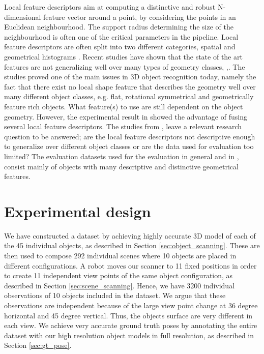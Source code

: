 \documentclass[10pt,twocolumn,letterpaper]{article}
\begin{document}
\indent Local feature descriptors aim at computing a distinctive and robust N-dimensional feature vector around a point, by considering the points in an Euclidean neighbourhood. The support radius determining the size of the neighbourhood is often one of the critical parameters in the pipeline. Local feature descriptors are often split into two different categories, spatial and geometrical histograms \cite{Salti2014}.
Recent studies have shown that the state of the art features are not generalizing well over many types of geometry classes, \cite{Guo2015},\cite{Buch2016}. The studies proved one of the main issues in 3D object recognition today, namely the fact that there exist no local shape feature that describes the geometry well over many different object classes, e.g. flat, rotational symmetrical and geometrically feature rich objects. What feature(s) to use are still dependent on the object geometry. However, the experimental result in \cite{Buch2016} showed the advantage of fusing several local feature descriptors. 
The studies from \cite{Guo2015},\cite{Buch2016} leave a relevant research question to be answered; are the local feature descriptors not descriptive enough to generalize over different object classes or are the data used for evaluation too limited? The evaluation datasets used for the evaluation in general and in \cite{Guo2015},\cite{Buch2016} consist mainly of objects with many descriptive and distinctive geometrical features.\\ 
\section{Experimental design} \label{sec:exp_design}
We have constructed a dataset by achieving highly accurate 3D model of each of the 45 individual objects, as described in Section \ref{sec:object_scanning}. These are then used to compose 292 individual scenes where 10 objects are placed in different configurations. A robot moves our scanner to 11 fixed positions in order to create 11 independent view points of the same object configuration, as described in Section \ref{sec:scene_scanning}. Hence, we have 3200 individual observations of 10 objects included in the dataset. We argue that these observations are independent because of the large view point change at 36 degree horizontal and 45 degree vertical. Thus, the objects surface are very different in each view. We achieve very accurate ground truth poses by annotating the entire dataset with our high resolution object models in full resolution, as described in Section \ref{sec:gt_pose}. 
\end{document}
